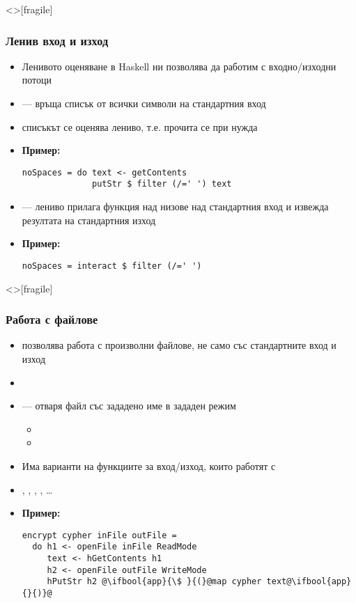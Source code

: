 \documentclass[alsotrans,beameroptions={aspectratio=169}]{beamerswitch}
\begin{document}
\begin{frame}<>[fragile]
  \frametitle{Ленив вход и изход}

  \begin{itemize}[<+->]
  \item Ленивото оценяване в Haskell ни позволява да работим с входно/изходни потоци
  \item {} --- връща списък от \alert{всички} символи на стандартния вход
  \item списъкът се оценява лениво, т.е. прочита се при нужда
  \item \textbf{Пример:}
\begin{lstlisting}
noSpaces = do text <- getContents
              putStr $ filter (/=' ') text
\end{lstlisting}
  \item {} --- лениво прилага функция над низове над стандартния вход и извежда резултата на стандартния изход
  \item \textbf{Пример:}
\begin{lstlisting}
noSpaces = interact $ filter (/=' ')
\end{lstlisting}
  \end{itemize}
\end{frame}

\begin{frame}<>[fragile]
  \frametitle{Работа с файлове}

  \begin{itemize}[<+->]
  \item {} позволява работа с произволни файлове, не само със стандартните вход и изход
  \item {}
  \item {} --- отваря файл със зададено име в зададен режим
    \begin{itemize}
      \footnotesize
    \item {}
    \item {}
    \end{itemize}
  \item Има варианти на функциите за вход/изход, които работят с 
  \item {}, , , , \ldots
  \item \textbf{Пример:}
    \vspace{-1ex}
\begin{lstlisting}
encrypt cypher inFile outFile =
  do h1 <- openFile inFile ReadMode
     text <- hGetContents h1
     h2 <- openFile outFile WriteMode
     hPutStr h2 @\ifbool{app}{\$ }{(}@map cypher text@\ifbool{app}{}{)}@
\end{lstlisting}
  \end{itemize}
\end{frame}
\end{document}
